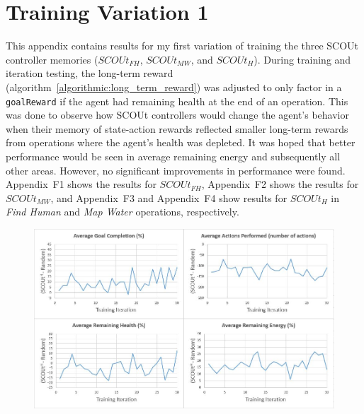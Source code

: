 \pagebreak
\tocless\section{Training Variation 1} \label{sec:training_variation1}
This appendix contains results for my first variation of training the three SCOUt controller memories ($SCOUt_{FH}$, $SCOUt_{MW}$, and $SCOUt_{H}$).
During training and iteration testing, the long-term reward (algorithm~\ref{algorithmic:long_term_reward}) was adjusted to only factor in a \texttt{goalReward} if the agent had remaining health at the end of an operation.
This was done to observe how SCOUt controllers would change the agent's behavior when their memory of state-action rewards reflected smaller long-term rewards from operations where the agent's health was depleted.
It was hoped that better performance would be seen in average remaining energy and subsequently all other areas.
However, no significant improvements in performance were found.
Appendix~F1 shows the results for $SCOUt_{FH}$, Appendix~F2 shows the results for $SCOUt_{MW}$, and Appendix~F3 and Appendix~F4 show results for $SCOUt_{H}$ in \textit{Find Human} and \textit{Map Water} operations, respectively.

\begin{appxfig}[H]
\begin{figure}[H]
  \centering
  \includegraphics[width=1.0\columnwidth]{Figures/Results/TrainingVariation1/FindHuman.JPG}
\end{figure}
\caption{Iteration testing performance results for $SCOUt_{FH}$ attempting \textit{Find Human} using setup variation 1 (see subsection~\ref{subsec:training_variations}). All graphs show the controller's average difference in performance compared to $Random$ ($SCOUt_{FH}$ average - $Random$ average) VS the number of training iterations completed.}
\label{appendix:findhuman_training_variation1}
\end{appxfig}


